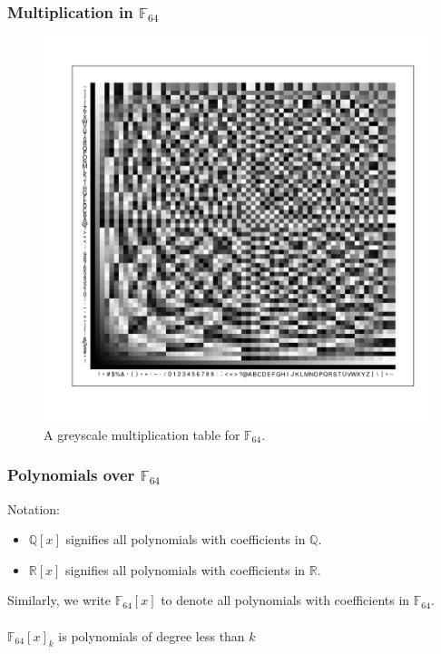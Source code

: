 \documentclass{beamer}
\begin{document}
\begin{frame}
	\frametitle{Multiplication in $\mathbb{F}_{64}$}

	\begin{figure}
	\includegraphics[height=0.7\textheight]{GreyScaleTable.pdf}
	\caption{A greyscale multiplication table for $\mathbb{F}_{64}$.}
	\label{fig:MultTable}
	\end{figure}

\end{frame}

\begin{frame}
	\frametitle{Polynomials over $\mathbb{F}_{64}$}
    Notation:
    \begin{itemize}
    	\item $\mathbb{Q}[x]$ signifies all polynomials with coefficients in $\mathbb{Q}$.
        \item $\mathbb{R}[x]$ signifies all polynomials with coefficients in $\mathbb{R}$.
    \end{itemize}
    Similarly, we write $\mathbb{F}_{64}[x]$ to denote all polynomials with coefficients in $\mathbb{F}_{64}$.\\~\\
    
    $\mathbb{F}_{64}[x]_{k}$ is polynomials of degree less than $k$
    
\end{frame}
\end{document}
